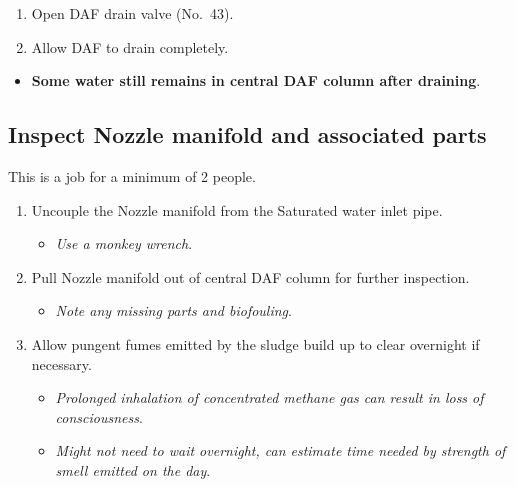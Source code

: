 \documentclass[
  12pt,
]{report}
\providecommand{\tightlist}{%
  \setlength{\itemsep}{0pt}\setlength{\parskip}{0pt}}\usepackage{longtable,booktabs,array}
\begin{document}
\begin{enumerate}
\def\labelenumi{\arabic{enumi}.}
\setcounter{enumi}{6}
\tightlist
\item
  Open DAF drain valve (No.~43).
\item
  Allow DAF to drain completely.
\end{enumerate}

\begin{itemize}
\tightlist
\item
  \textbf{Some water still remains in central DAF column after
  draining}.
\end{itemize}

\hypertarget{inspect-nozzle-manifold-and-associated-parts}{%
\subsection{Inspect Nozzle manifold and associated
parts}\label{inspect-nozzle-manifold-and-associated-parts}}

{This is a job for a minimum of 2 people}.

\begin{enumerate}
\def\labelenumi{\arabic{enumi}.}
\setcounter{enumi}{8}
\tightlist
\item
  Uncouple the Nozzle manifold from the Saturated water inlet pipe.

  \begin{itemize}
  \tightlist
  \item
    \emph{Use a monkey wrench}.
  \end{itemize}
\item
  Pull Nozzle manifold out of central DAF column for further inspection.

  \begin{itemize}
  \tightlist
  \item
    \emph{Note any missing parts and biofouling}.
  \end{itemize}
\item
  Allow pungent fumes emitted by the sludge build up to clear overnight
  if necessary.

  \begin{itemize}
  \tightlist
  \item
    \emph{Prolonged inhalation of concentrated methane gas can result in
    loss of consciousness}.
  \item
    \emph{Might not need to wait overnight, can estimate time needed by
    strength of smell emitted on the day}.
  \end{itemize}
\end{enumerate}
\end{document}
